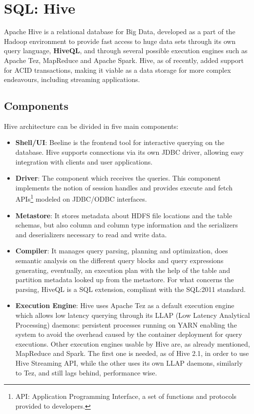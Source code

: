\pagebreak
\section{SQL: Hive}

Apache Hive is a relational database for Big Data, developed as a part of the Hadoop environment to provide fast access to huge data sets through its own query language, \textbf{HiveQL}, and through several possible execution engines such as Apache Tez, MapReduce and Apache Spark. Hive, as of recently, added  support for ACID transactions, making it viable as a data storage for more complex endeavours, including streaming applications.

\subsection{Components}

Hive architecture can be divided in five main components:

\begin{itemize}
    \item \textbf{Shell/UI}: Beeline is the frontend tool for interactive querying on the database. Hive supports connections via its own JDBC driver, allowing easy integration with clients and user applications.
    \item \textbf{Driver}: The component which receives the queries. This component implements the notion of session handles and provides execute and fetch APIs\footnote{API: Application Programming Interface, a set of functions and protocols provided to developers.} modeled on JDBC/ODBC interfaces.
    \item \textbf{Metastore}: It stores metadata about HDFS file locations and the table schemas, but also column and column type information and the serializers and deserializers necessary to read and write data.
    \item \textbf{Compiler}: It manages query parsing, planning and optimization, does semantic analysis on the different query blocks and query expressions generating, eventually, an execution plan with the help of the table and partition metadata looked up from the metastore. For what concerns the parsing, HiveQL is a SQL extension, compliant with the SQL:2011 standard.
    \item \textbf{Execution Engine}: Hive uses Apache Tez as a default execution engine  which allows low latency querying through its LLAP (Low Latency Analytical Processing) daemons: persistent processes running on YARN enabling the system to avoid the overhead caused by the container deployment for query executions. Other execution engines usable by Hive are, as already mentioned, MapReduce and Spark. The first one is needed, as of Hive 2.1, in order to use Hive Streaming API, while the other uses its own LLAP daemons, similarly to Tez, and still lags behind, performance wise.
\end{itemize}


